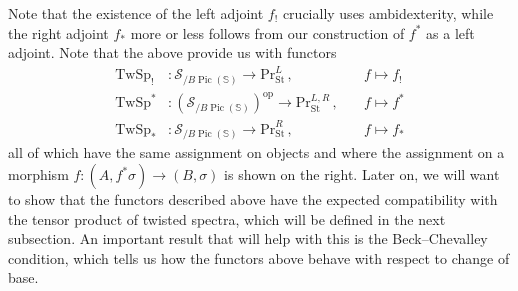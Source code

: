 \documentclass[10pt]{amsart}
\newcommand{\longto}{\longrightarrow}
\theoremstyle{plain}
\theoremstyle{definition}
\DeclareMathOperator{\Pic}{Pic}
\newcommand{\St}{\mathrm{St}}
\newcommand{\oop}{\mathrm{op}}
\newcommand{\bS}{\mathbb{S}}
\newcommand{\TwSp}{\mathrm{TwSp}}
\newcommand{\cS}{\mathcal{S}}
\begin{document}
Note that the existence of the left adjoint $f_!$ crucially uses ambidexterity, while the right adjoint $f_*$ more or less follows from our construction of $f^*$ as a left adjoint.
Note that the above provide us with functors
\begin{equation*}
  \begin{aligned}
\TwSp_{!} &: \cS_{/B\Pic(\bS)} \longto \mathrm{Pr}^{L}_{\St} \,, \quad &f \mapsto f_!  \\
\TwSp^* &: (\cS_{/B\Pic(\bS)})^{\oop} \longto \mathrm{Pr}^{L,R}_{\St} \,, \quad &f \mapsto f^* \\
\TwSp_* &: \cS_{/B\Pic(\bS)} \longto \mathrm{Pr}^{R}_{\St} \,, \quad &f \mapsto f_*
\end{aligned}
\end{equation*}
all of which have the same assignment on objects and where the assignment on a morphism $f : (A,f^*\sigma) \to (B,\sigma)$ is shown on the right.
Later on, we will want to show that the functors described above have the expected compatibility with the tensor product of twisted spectra, which will be defined in the next subsection.
An important result that will help with this is the Beck--Chevalley condition, which tells us how the functors above behave with respect to change of base.
\end{document}
